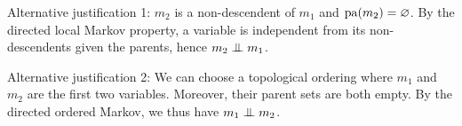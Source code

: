 \begin{exenumerate}
\begin{solution}
       Alternative justification 1: $m_2$ is a non-descendent of $m_1$
       and $\mathrm{pa}(m_2) = \varnothing$. By the directed local Markov
       property, a variable is independent from its non-descendents
       given the parents, hence $m_2 \mathrel{\perp\mspace{-10mu}\perp} m_1$.

       Alternative justification 2: We can choose a topological
       ordering where $m_1$ and $m_2$ are the first two
       variables. Moreover, their parent sets are both empty. By the
       directed ordered Markov, we thus have $m_1 \mathrel{\perp\mspace{-10mu}\perp} m_2$.
       
     \end{solution}

     
   \end{exenumerate}

